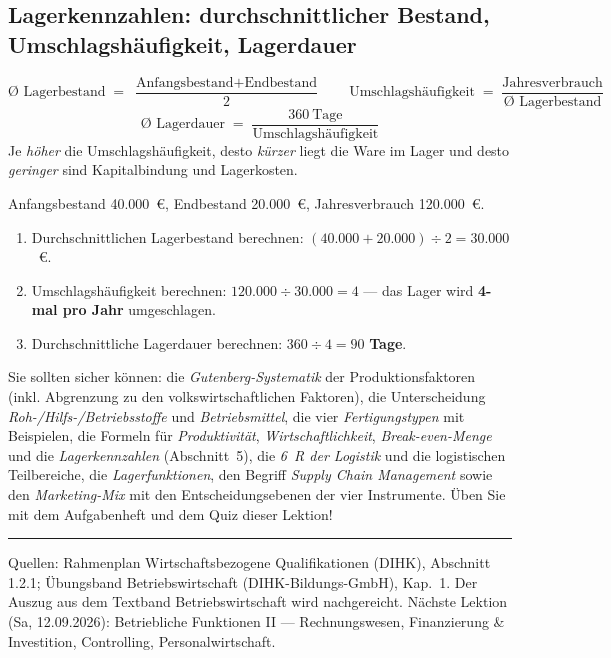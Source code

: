 \documentclass[11pt, a4paper]{article}
\begin{document}
\subsection{Lagerkennzahlen: durchschnittlicher Bestand, Umschlagshäufigkeit, Lagerdauer}

\begin{merksatz}[title={\bfseries Formeln: Lagerkennzahlen}]
\[
\text{Ø Lagerbestand} \;=\; \frac{\text{Anfangsbestand} + \text{Endbestand}}{2}
\qquad
\text{Umschlagshäufigkeit} \;=\; \frac{\text{Jahresverbrauch}}{\text{Ø Lagerbestand}}
\]
\[
\text{Ø Lagerdauer} \;=\; \frac{360\ \text{Tage}}{\text{Umschlagshäufigkeit}}
\]
Je \emph{höher} die Umschlagshäufigkeit, desto \emph{kürzer} liegt die Ware im Lager
und desto \emph{geringer} sind Kapitalbindung und Lagerkosten.
\end{merksatz}

\begin{beispiel}
Anfangsbestand 40.000~€, Endbestand 20.000~€, Jahresverbrauch 120.000~€.
\begin{enumerate}
  \item Durchschnittlichen Lagerbestand berechnen:
    $(40.000 + 20.000) \div 2 = 30.000$~€.
  \item Umschlagshäufigkeit berechnen: $120.000 \div 30.000 = 4$ ---
    das Lager wird \textbf{4-mal pro Jahr} umgeschlagen.
  \item Durchschnittliche Lagerdauer berechnen: $360 \div 4 = 90$ \textbf{Tage}.
\end{enumerate}
\end{beispiel}

\begin{merksatz}[title={\bfseries Wichtig für die Prüfungsvorbereitung}]
Sie sollten sicher können: die \emph{Gutenberg-Systematik} der Produktionsfaktoren
(inkl. Abgrenzung zu den volkswirtschaftlichen Faktoren), die Unterscheidung
\emph{Roh-/Hilfs-/Betriebsstoffe} und \emph{Betriebsmittel}, die vier
\emph{Fertigungstypen} mit Beispielen, die Formeln für \emph{Produktivität},
\emph{Wirtschaftlichkeit}, \emph{Break-even-Menge} und die \emph{Lagerkennzahlen}
(Abschnitt~5), die \emph{6~R der Logistik} und die logistischen
Teilbereiche, die \emph{Lagerfunktionen}, den Begriff \emph{Supply Chain Management}
sowie den \emph{Marketing-Mix} mit den Entscheidungsebenen der vier Instrumente.
Üben Sie mit dem Aufgabenheft und dem Quiz dieser Lektion!
\end{merksatz}

\vspace{1em}
\hrule
\vspace{0.8em}
\noindent\textsf{\small Quellen: Rahmenplan Wirtschaftsbezogene Qualifikationen (DIHK), Abschnitt 1.2.1;
Übungsband Betriebswirtschaft (DIHK-Bildungs-GmbH), Kap.~1. Der Auszug aus dem Textband
Betriebswirtschaft wird nachgereicht. Nächste Lektion (Sa, 12.09.2026): Betriebliche Funktionen II ---
Rechnungswesen, Finanzierung \& Investition, Controlling, Personalwirtschaft.}
\end{document}
